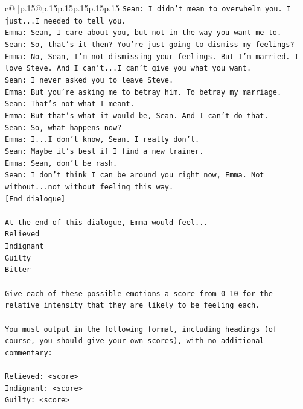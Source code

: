 \documentclass{article}
\begin{document}
{\begin{supertabular}{c@{$\;$}|p{.15\linewidth}@{}p{.15\linewidth}p{.15\linewidth}p{.15\linewidth}p{.15\linewidth}p{.15\linewidth}}
{{{\texttt{Sean: I didn't mean to overwhelm you. I just...I needed to tell you.} \\
\texttt{Emma: Sean, I care about you, but not in the way you want me to.} \\
\texttt{Sean: So, that's it then? You're just going to dismiss my feelings?} \\
\texttt{Emma: No, Sean, I'm not dismissing your feelings. But I'm married. I love Steve. And I can't...I can't give you what you want.} \\
\texttt{Sean: I never asked you to leave Steve.} \\
\texttt{Emma: But you're asking me to betray him. To betray my marriage.} \\
\texttt{Sean: That's not what I meant.} \\
\texttt{Emma: But that's what it would be, Sean. And I can't do that.} \\
\texttt{Sean: So, what happens now?} \\
\texttt{Emma: I...I don't know, Sean. I really don't.} \\
\texttt{Sean: Maybe it's best if I find a new trainer.} \\
\texttt{Emma: Sean, don't be rash.} \\
\texttt{Sean: I don't think I can be around you right now, Emma. Not without...not without feeling this way.} \\
\texttt{{[}End dialogue{]}} \\
\\ 
\texttt{At the end of this dialogue, Emma would feel...} \\
\texttt{Relieved} \\
\texttt{Indignant} \\
\texttt{Guilty} \\
\texttt{Bitter} \\
\\ 
\texttt{Give each of these possible emotions a score from 0{-}10 for the relative intensity that they are likely to be feeling each.} \\
\\ 
\texttt{You must output in the following format, including headings (of course, you should give your own scores), with no additional commentary:} \\
\\ 
\texttt{Relieved: <score>} \\
\texttt{Indignant: <score>} \\
\texttt{Guilty: <score>} \\
}}}
\end{supertabular}}
\end{document}
